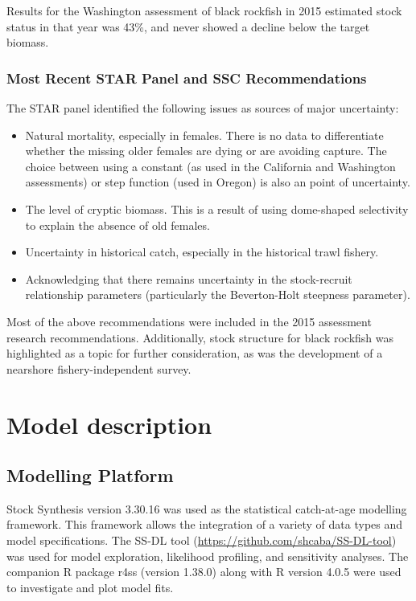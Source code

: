 \documentclass[11pt,
  english,
  letterpaper,
]{article}
\providecommand{\tightlist}{%
  \setlength{\itemsep}{0pt}\setlength{\parskip}{0pt}}
\providecommand{\tightlist}{%
  \setlength{\itemsep}{0pt}\setlength{\parskip}{0pt}}
\begin{document}
Results for the Washington assessment of black rockfish in 2015 estimated stock status in that year was 43\%, and never showed a decline below the target biomass.

\hypertarget{most-recent-star-panel-and-ssc-recommendations}{%
\subsubsection{Most Recent STAR Panel and SSC Recommendations}\label{most-recent-star-panel-and-ssc-recommendations}}

The STAR panel identified the following issues as sources of major uncertainty:

\begin{itemize}
\tightlist
\item
  Natural mortality, especially in females. There is no data to differentiate whether the missing older females are dying or are avoiding capture. The choice between using a constant (as used in the California and Washington assessments) or step function (used in Oregon) is also an point of uncertainty.
\item
  The level of cryptic biomass. This is a result of using dome-shaped selectivity to explain the absence of old females.
\item
  Uncertainty in historical catch, especially in the historical trawl fishery.
\item
  Acknowledging that there remains uncertainty in the stock-recruit relationship parameters (particularly the Beverton-Holt steepness parameter).
\end{itemize}

Most of the above recommendations were included in the 2015 assessment research recommendations. Additionally, stock structure for black rockfish was highlighted as a topic for further consideration, as was the development of a nearshore fishery-independent survey.

\hypertarget{model-description}{%
\section{Model description}\label{model-description}}

\hypertarget{modelling-platform}{%
\subsection{Modelling Platform}\label{modelling-platform}}

Stock Synthesis version 3.30.16 was used as the statistical catch-at-age modelling framework. This framework allows the integration of a variety of data types and model specifications. The SS-DL tool (\url{https://github.com/shcaba/SS-DL-tool}) was used for model exploration, likelihood profiling, and sensitivity analyses. The companion R package r4ss (version 1.38.0) along with R version 4.0.5 were used to investigate and plot model fits.
\end{document}
